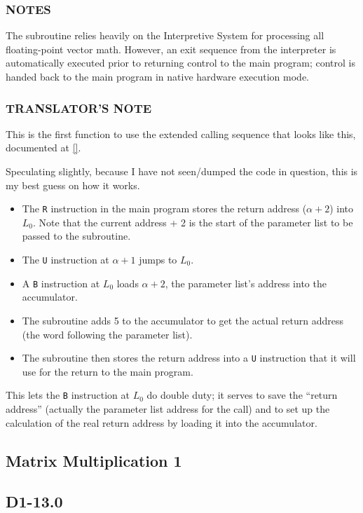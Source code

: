 \documentclass{article}
\begin{document}
\subsubsection*{NOTES}
The subroutine relies heavily on the Interpretive System for processing all floating-point vector math. However, an exit sequence from the interpreter is automatically executed prior to returning control to the main program; control is handed back to the main program in native hardware execution mode.

\subsubsection*{TRANSLATOR'S NOTE}
This is the first function to use the extended calling sequence that looks like this, documented at \ref{}.

Speculating slightly, because I have not seen/dumped the code in question, this is my best guess on how it works.
\begin{itemize}
	\item The \texttt{R} instruction in the main program stores the return address ($\alpha+2$) into $L_0$. Note that the current address + 2 is the start of the parameter list to be passed to the subroutine.
	\item The \texttt{U} instruction at $\alpha+1$ jumps to $L_0$.
	\item A \texttt{B} instruction at $L_0$ loads $\alpha+2$, the parameter list's address into the accumulator.
	\item The subroutine adds 5 to the accumulator to get the actual return address (the word following the parameter list).
	\item The subroutine then stores the return address into a \texttt{U} instruction that it will use for the return to the main program.
\end{itemize}
\noindent
This lets the \texttt{B} instruction at $L_0$ do double duty; it serves to save the ``return address'' (actually the parameter list address for the call) and to set up the calculation of the real return address by loading it into the accumulator.
\newpage

\subsection{Matrix Multiplication 1}
\label{subsec:matrix_multiplication_1}
\subsection*{D1-13.0}
\end{document}

